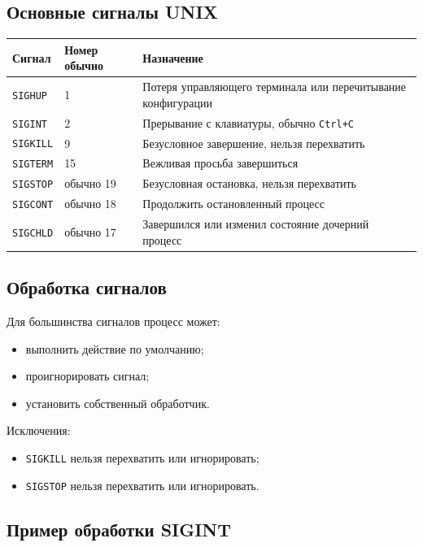 \documentclass[12pt,a4paper]{article}
\begin{document}
\subsection{Основные сигналы UNIX}

\begin{longtable}{|p{3cm}|p{3cm}|p{7cm}|}
\hline
\textbf{Сигнал} & \textbf{Номер обычно} & \textbf{Назначение} \\
\hline
\texttt{SIGHUP} & 1 & Потеря управляющего терминала или перечитывание конфигурации \\
\hline
\texttt{SIGINT} & 2 & Прерывание с клавиатуры, обычно \texttt{Ctrl+C} \\
\hline
\texttt{SIGKILL} & 9 & Безусловное завершение, нельзя перехватить \\
\hline
\texttt{SIGTERM} & 15 & Вежливая просьба завершиться \\
\hline
\texttt{SIGSTOP} & обычно 19 & Безусловная остановка, нельзя перехватить \\
\hline
\texttt{SIGCONT} & обычно 18 & Продолжить остановленный процесс \\
\hline
\texttt{SIGCHLD} & обычно 17 & Завершился или изменил состояние дочерний процесс \\
\hline
\end{longtable}

\subsection{Обработка сигналов}

Для большинства сигналов процесс может:

\begin{itemize}
    \item выполнить действие по умолчанию;
    \item проигнорировать сигнал;
    \item установить собственный обработчик.
\end{itemize}

Исключения:
\begin{itemize}
    \item \texttt{SIGKILL} нельзя перехватить или игнорировать;
    \item \texttt{SIGSTOP} нельзя перехватить или игнорировать.
\end{itemize}

\subsection{Пример обработки SIGINT}
\end{document}
